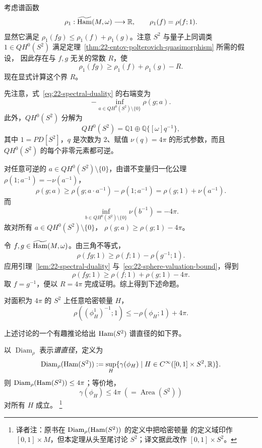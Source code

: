 \begin{example}
\label{ex:22-sphere-spectral-diameter}
考虑谱函数
\[
 \rho_1:\widetilde{\operatorname{Ham}}(M,\omega)\longrightarrow\mathbb R,
 \qquad \rho_1(f)=\rho(f;1).
\]
显然它满足 $\rho_1(fg)\leq\rho_1(f)+\rho_1(g)$。注意 $S^2$ 与量子上同调类
$1\in QH^0(S^2)$ 满足定理~\ref{thm:22-entov-polterovich-quasimorphism} 所需的假设，
因此存在与 $f,g$ 无关的常数 $R$，使
\begin{equation}
 \rho_1(fg)\geq\rho_1(f)+\rho_1(g)-R.
 \label{eq:22-sphere-quasimorphism-bound}
\end{equation}
现在显式计算这个界 $R$。

先注意，式~\eqref{eq:22-spectral-duality} 的右端变为
\[
 -\inf_{a\in QH^0(S^2)\setminus\{0\}}\rho(g;a).
\]
此外，$QH^0(S^2)$ 分解为
\[
 QH^0(S^2)=\mathbb Q1\oplus\mathbb Q\{[\omega]q^{-1}\},
\]
其中 $1=PD[S^2]$，$q$ 是次数为 $2$、赋值 $\nu(q)=4\pi$ 的形式参数，而且
$QH^0(S^2)$ 的每个非零元素都可逆。

对任意可逆的 $a\in QH^0(S^2)\setminus\{0\}$，由谱不变量归一化公理
$\rho(1;a^{-1})=-\nu(a^{-1})$，
\[
 \rho(g;a)\geq\rho(g;a\cdot a^{-1})-\rho(1;a^{-1})
 =\rho(g;1)+\nu(a^{-1}).
\]
而
\begin{equation}
 \inf_{b\in QH^0(S^2)\setminus\{0\}}\nu(b^{-1})=-4\pi.
 \label{eq:22-sphere-valuation-bound}
\end{equation}
故对所有 $a\in QH^0(S^2)\setminus\{0\}$，
$\rho(g;a)\geq\rho(g;1)-4\pi$。

令 $f,g\in\widetilde{\operatorname{Ham}}(M,\omega)$。由三角不等式，
\[
 \rho(fg;1)\geq\rho(f;1)-\rho(g^{-1};1).
\]
应用引理~\ref{lem:22-spectral-duality} 与~\eqref{eq:22-sphere-valuation-bound}，得到
\[
 \rho(fg;1)\geq\rho(f;1)+\rho(g;1)-4\pi.
\]
取 $f=g^{-1}$，便以 $R=4\pi$ 完成证明。综上得到下述命题。
\end{example}

\begin{proposition}
\label{prop:22-sphere-inverse-spectral-bound}
对面积为 $4\pi$ 的 $S^2$ 上任意哈密顿量 $H$，
\begin{equation}
 \rho((\phi_H^1)^{-1};1)\leq-\rho(\phi_H;1)+4\pi.
 \label{eq:22-sphere-inverse-bound}
\end{equation}
\end{proposition}

上述讨论的一个有趣推论给出 $\operatorname{Ham}(S^2)$ 谱直径的如下界。

\begin{theorem}
\label{thm:22-sphere-spectral-diameter}
以 $\operatorname{Diam}_\rho$ 表示\emph{谱直径}，定义为
\[
 \operatorname{Diam}_\rho(\operatorname{Ham}(S^2))
 :=\sup_H\{\gamma(\phi_H)\mid H\in C^\infty([0,1]\times S^2,\mathbb R)\}.
\]
则 $\operatorname{Diam}_\rho(\operatorname{Ham}(S^2))\leq4\pi$；等价地，
\begin{equation}
 \gamma(\phi_H)\leq4\pi\;(=\operatorname{Area}(S^2))
 \label{eq:22-sphere-spectral-diameter}
\end{equation}
对所有 $H$ 成立。
\footnote{译者注：原书在 $\operatorname{Diam}_\rho(\operatorname{Ham}(S^2))$ 的定义中把哈密顿量
的定义域印作 $[0,1]\times M$，但本定理从头至尾讨论 $S^2$；译文据此改作
$[0,1]\times S^2$。}
\end{theorem}

